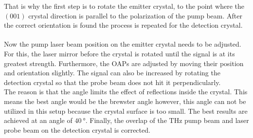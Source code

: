 That is why the first step is to rotate the emitter crystal, to the point where the $(001)$ crystal direction is parallel to the polarization of the pump beam.
After the correct orientation is found the process is repeated for the detection crystal.
\\\\
Now the pump laser beam position on the emitter crystal needs to be adjusted.
For this, the laser mirror before the crystal is rotated until the signal is at its greatest strength.
Furthermore, the OAPs are adjusted by moving their position and orientation slightly.
The signal can also be increased by rotating the detection crystal so that the probe beam does not hit it perpendicularly.
\\
The reason is that the angle limits the effect of reflections inside the crystal.
This means the best angle would be the brewster angle however, this angle can not be utilized in this setup because the crystal surface is too small. 
The best results are achieved at an angle of $\SI{40}{\degree}$.
Finally, the overlap of the $\si{\tera\hertz}$ pump beam and laser probe beam on the detection crystal is corrected.

\FloatBarrier
